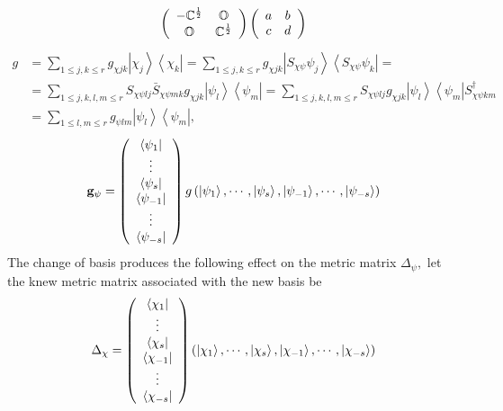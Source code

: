 \documentclass[aps,preprint]{revtex4}%
\begin{document}
\begin{equation}
\left(
\begin{array}
[c]{cc}%
-\mathbb{C}^{\frac{1}{2}} & \mathbb{O}\\
\mathbb{O} & \mathbb{C}^{\frac{1}{2}}%
\end{array}
\right)  \left(
\begin{array}
[c]{cc}%
a & b\\
c & d
\end{array}
\right)
\end{equation}%
\begin{align}
g &  =\sum_{1\leq j,k\leq r}g_{\chi jk}\left\vert \chi_{j}\right\rangle
\left\langle \chi_{k}\right\vert =\sum_{1\leq j,k\leq r}g_{\chi jk}\left\vert
S_{\chi\psi}\psi_{j}\right\rangle \left\langle S_{\chi\psi}\psi_{k}\right\vert
=\nonumber\\
&  =\sum_{1\leq j,k,l,m\leq r}S_{\chi\psi lj}\bar{S}_{\chi\psi mk}g_{\chi
jk}\left\vert \psi_{l}\right\rangle \left\langle \psi_{m}\right\vert
=\sum_{1\leq j,k,l,m\leq r}S_{\chi\psi lj}g_{\chi jk}\left\vert \psi
_{l}\right\rangle \left\langle \psi_{m}\right\vert S_{\chi\psi km}^{\dagger}\\
&  =\sum_{1\leq l,m\leq r}g_{\psi lm}\left\vert \psi_{l}\right\rangle
\left\langle \psi_{m}\right\vert ,
\end{align}%
\begin{equation}
\mathbf{g}_{\psi}=\left(
\begin{array}
[c]{c}%
\left\langle \psi_{1}\right\vert \\
\vdots\\
\left\langle \psi_{s}\right\vert \\
\left\langle \psi_{-1}\right\vert \\
\vdots\\
\left\langle \psi_{-s}\right\vert
\end{array}
\right)  g\left(  \left\vert \psi_{1}\right\rangle ,\cdots,\left\vert \psi
_{s}\right\rangle ,\left\vert \psi_{-1}\right\rangle ,\cdots,\left\vert
\psi_{-s}\right\rangle \right)
\end{equation}
The change of basis produces the following effect on the metric matrix
$\Delta_{\psi},$ let the knew metric matrix associated with the new basis be
\begin{equation}
\Delta_{\chi}=\left(
\begin{array}
[c]{c}%
\left\langle \chi_{1}\right\vert \\
\vdots\\
\left\langle \chi_{s}\right\vert \\
\left\langle \chi_{-1}\right\vert \\
\vdots\\
\left\langle \chi_{-s}\right\vert
\end{array}
\right)  \left(  \left\vert \chi_{1}\right\rangle ,\cdots,\left\vert \chi
_{s}\right\rangle ,\left\vert \chi_{-1}\right\rangle ,\cdots,\left\vert
\chi_{-s}\right\rangle \right)  \nonumber
\end{equation}
\end{document}
